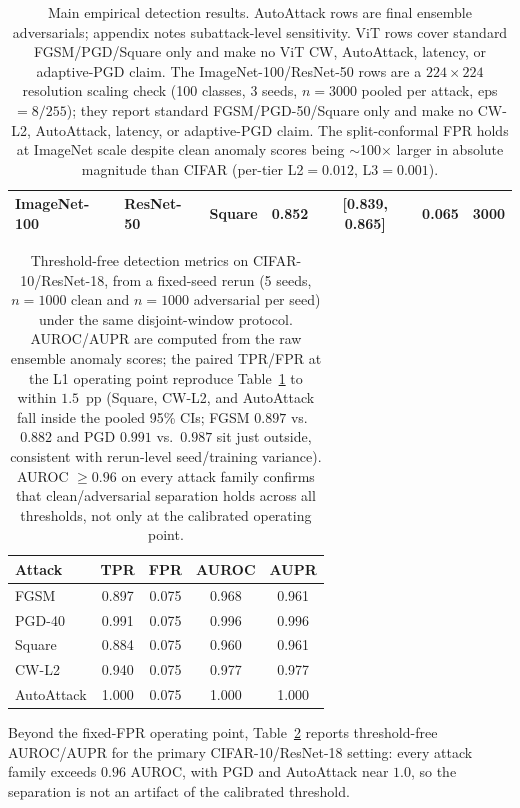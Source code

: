 \documentclass{article}
\begin{document}
\begin{table}[t]
{\begin{tabular}{lllcccc}
ImageNet-100 & ResNet-50 & Square & 0.852 & [0.839, 0.865] & 0.065 & 3000 \\
\bottomrule
\end{tabular}}
\caption{Main empirical detection results. AutoAttack rows are final ensemble adversarials; appendix notes subattack-level sensitivity. ViT rows cover standard FGSM/PGD/Square only and make no ViT CW, AutoAttack, latency, or adaptive-PGD claim. The ImageNet-100/ResNet-50 rows are a $224\times224$ resolution scaling check (100 classes, 3 seeds, $n{=}3000$ pooled per attack, eps$=8/255$); they report standard FGSM/PGD-50/Square only and make no CW-L2, AutoAttack, latency, or adaptive-PGD claim. The split-conformal FPR holds at ImageNet scale despite clean anomaly scores being $\sim$100$\times$ larger in absolute magnitude than CIFAR (per-tier L2$=0.012$, L3$=0.001$).}
\label{tab:main}
\end{table}

\begin{table}[t]
\centering
\small
\begin{tabular}{lcccc}
\toprule
Attack & TPR & FPR & AUROC & AUPR \\
\midrule
FGSM & 0.897 & 0.075 & 0.968 & 0.961 \\
PGD-40 & 0.991 & 0.075 & 0.996 & 0.996 \\
Square & 0.884 & 0.075 & 0.960 & 0.961 \\
CW-L2 & 0.940 & 0.075 & 0.977 & 0.977 \\
AutoAttack & 1.000 & 0.075 & 1.000 & 1.000 \\
\bottomrule
\end{tabular}
\caption{Threshold-free detection metrics on CIFAR-10/ResNet-18, from a fixed-seed rerun (5 seeds, $n{=}1000$ clean and $n{=}1000$ adversarial per seed) under the same disjoint-window protocol. AUROC/AUPR are computed from the raw ensemble anomaly scores; the paired TPR/FPR at the L1 operating point reproduce Table~\ref{tab:main} to within $1.5$~pp (Square, CW-L2, and AutoAttack fall inside the pooled 95\% CIs; FGSM $0.897$ vs.\ $0.882$ and PGD $0.991$ vs.\ $0.987$ sit just outside, consistent with rerun-level seed/training variance). AUROC $\geq 0.96$ on every attack family confirms that clean/adversarial separation holds across all thresholds, not only at the calibrated operating point.}
\label{tab:auroc}
\end{table}

Beyond the fixed-FPR operating point, Table~\ref{tab:auroc} reports threshold-free AUROC/AUPR for the primary CIFAR-10/ResNet-18 setting: every attack family exceeds $0.96$ AUROC, with PGD and AutoAttack near $1.0$, so the separation is not an artifact of the calibrated threshold.
\end{document}
